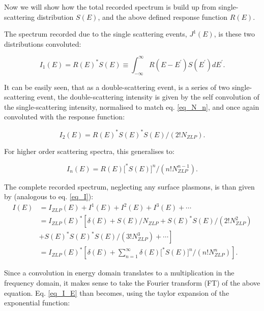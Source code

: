 Now we will show how the total recorded spectrum is build up from single-scattering distribution $S(E)$, and the above defined response function $R(E)$. 


The spectrum recorded due to the single scattering events, $J^1(E)$, is these two distributions convoluted:

\begin{equation} \label{eq_I_1}
    I_{1}(E)=R(E)^{*} S(E) \equiv \int_{-\infty}^{\infty} R\left(E-E^{\prime}\right) S\left(E^{\prime}\right) d E^{\prime}.
\end{equation}


It can be easily seen, that as a double-scattering event, is a series of two single-scattering event, the double-scattering intensity is given by the self convolution of the single-scattering intensity, normalised to match eq. \eqref{eq_N_n}, and once again convoluted with the response function:

\begin{equation}
    I_{2}(E)=R(E)^{*} S(E)^{*} S(E) /\left(2 ! N_{ZLP}\right).
\end{equation}

For higher order scattering spectra, this generalises to:


\begin{equation} \label{eq_def_I_n}
    I_{n}(E)=R(E)\big[^{*} S(E)\big]^{n} /\left(n ! N_{ZLP}^{n-1}\right).
\end{equation}

The complete recorded spectrum, neglecting any surface plasmons, is than given by (analogous to eq. \eqref{eq_I}):
\begin{equation} \label{eq_I_E}
    \begin{aligned}
        I(E) &=I_{ZLP}(E)+I^{1}(E)+I^{2}(E)+I^{3}(E)+\cdots \\
        &=I_{ZLP}(E)^{*}\left[\delta(E)+S(E) / N_{ZLP}+S(E)^{*} S(E) /\left(2 ! N_{ZLP}^{2}\right)\right.\\
        &\left.+S(E)^{*} S(E)^{*} S(E) /\left(3 ! N_{ZLP}^{3}\right)+\cdots\right]\\
        &= I_{ZLP}(E)^{*}\left[\delta(E)+ \sum_{n=1}^\infty \delta(E)\big[^{*} S(E)\big]^{n} /\left(n ! N_{ZLP}^{n}\right) \right].
        \end{aligned}
\end{equation}

Since a convolution in energy domain translates to a multiplication in the frequency domain, it makes sense to take the Fourier transform (FT) of the above equation. Eq. \eqref{eq_I_E} than becomes, using the taylor expansion of the exponential function:

